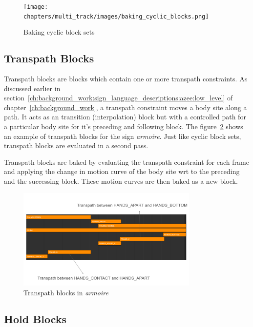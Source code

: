 \documentclass[../../main.tex]{subfiles}
\begin{document}
\begin{figure}
    \centering
    \texttt{[image: chapters/multi\_track/images/baking\_cyclic\_blocks.png]}
    \caption{Baking cyclic block sets}
    \label{fig:baking_cyclic_blocks}
\end{figure}

\subsection{Transpath Blocks}
\label{ch:multi_track:second_pass:transpath_blocks}

Transpath blocks are blocks which contain one or more transpath constraints. As discussed earlier in section~\ref{ch:background_work:sign_language_descriptions:azee:low_level} of chapter~\ref{ch:background_work}, a transpath constraint moves a body site along a path. It acts as an transition (interpolation) block but with a controlled path for a particular body site for it's preceding and following block. The figure~\ref{fig:transpath_blocks} shows an example of transpath blocks for the sign \emph{armoire}. Just like cyclic block sets, transpath blocks are evaluated in a second pass.

Transpath blocks are baked by evaluating the transpath constraint for each frame and applying the change in motion curve of the body site wrt to the preceding and the successing block. These motion curves are then baked as a new block.

\begin{figure}[h]
    \centering
    \includegraphics[width=0.8\textwidth]{chapters/multi_track/images/transpath_blocks.png}
    \caption{Transpath blocks in \emph{armoire}}
    \label{fig:transpath_blocks}
\end{figure}

\subsection{Hold Blocks}
\label{ch:multi_track:second_pass:hold_blocks}
\end{document}
